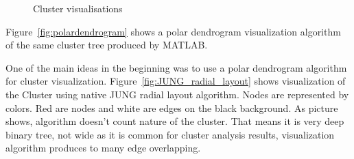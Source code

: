 \begin{figure}[h!]
\centering
{}
\label{fig:dendrograms}
\caption{Cluster visualisations}
\end{figure}


Figure~\ref{fig:polardendrogram} shows a polar dendrogram visualization algorithm of the same cluster tree produced by MATLAB.

One of the main ideas in the beginning was to use a polar dendrogram algorithm for cluster visualization. Figure~\ref{fig:JUNG_radial_layout} shows visualization of the Cluster using native JUNG radial layout algorithm.
Nodes are represented by colors. Red are nodes and white are edges on the black background. As picture shows, algorithm doesn't count nature of the cluster.
That means it is very deep binary tree, not wide as it is common for cluster analysis results, visualization algorithm produces to many edge overlapping.



